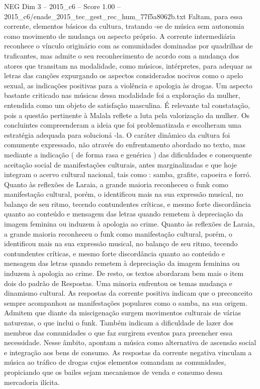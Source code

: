 \begin{textsample}{NEG Dim 3 – 2015\_c6 – Score 1.00 – 2015\_c6/enade\_2015\_tec\_gest\_rec\_hum\_77f5a8062b.txt}
Faltam, para essa corrente, elementos básicos da cultura, tratando -se de música sem autonomia como movimento de mudança ou aspecto próprio.
A corrente intermediária reconhece o vínculo originário com as comunidades dominadas por quadrilhas de traficantes, mas admite o seu reconhecimento de acordo com a mudança dos atores que transitam na modalidade, como músicos, intérpretes, para adequar as letras das canções expurgando os aspectos considerados nocivos como o apelo sexual, as indicações positivas para a violência e apologia às drogas.
Um aspecto bastante criticado nas músicas dessa modalidade foi a exploração da mulher, entendida como um objeto de satisfação masculina.
É relevante tal constatação, pois a questão pertinente à Malala reflete a luta pela valorização da mulher.
Os concluintes compreenderam a ideia que foi problematizada e escolheram uma estratégia adequada para solucioná -la.
O caráter dinâmico da cultura foi comumente expressado, não através do enfrentamento abordado no texto, mas mediante a indicação ( de forma rasa e genérica ) das dificuldades e consequente aceitação social de manifestações culturais, antes marginalizadas e que hoje integram o acervo cultural nacional, tais como : samba, grafite, capoeira e forró.
Quanto às reflexões de Laraia, a grande maioria reconheceu o funk como manifestação cultural, porém, o identificou mais na sua expressão musical, no balanço de seu ritmo, tecendo contundentes críticas, e mesmo forte discordância quanto ao conteúdo e mensagem das letras quando remetem à depreciação da imagem feminina ou induzem à apologia ao crime.
Quanto às reflexões de Laraia, a grande maioria reconheceu o funk como manifestação cultural, porém, o identificou mais na sua expressão musical, no balanço de seu ritmo, tecendo contundentes críticas, e mesmo forte discordância quanto ao conteúdo e mensagem das letras quando remetem à depreciação da imagem feminina ou induzem à apologia ao crime.
De resto, os textos abordaram bem mais o item dois do padrão de Respostas.
Uma minoria enfrentou os temas mudança e dinamismo cultural.
As respostas da corrente positiva indicam que o preconceito sempre acompanhou as manifestações populares como o samba, na sua origem.
Admitem que diante da miscigenação surgem movimentos culturais de várias naturezas, o que inclui o funk.
Também indicam a dificuldade de lazer dos membros das comunidades o que faz surgirem eventos para preencher essa necessidade.
Nesse âmbito, apontam a música como alternativa de ascensão social e integração aos bens de consumo.
As respostas da corrente negativa vinculam a música ao tráfico de drogas cujos elementos comandam as comunidades, propiciando que os bailes sejam mecanismos de venda e consumo dessa mercadoria ilícita.

\end{textsample}
